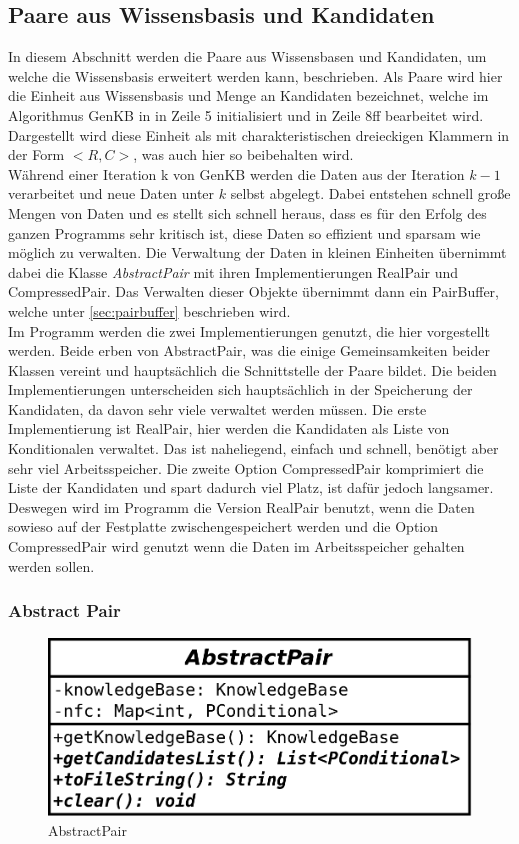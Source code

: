 \documentclass[12pt,a4paper]{article}
\begin{document}
\subsection{Paare aus Wissensbasis und Kandidaten}
In diesem Abschnitt werden die Paare aus Wissensbasen und Kandidaten, um welche die Wissensbasis erweitert werden kann, beschrieben. Als Paare wird hier die Einheit aus Wissensbasis und Menge an Kandidaten bezeichnet, welche im Algorithmus GenKB in \cite{beierle19} in Zeile 5 initialisiert und in Zeile 8ff bearbeitet wird. Dargestellt wird diese Einheit als mit charakteristischen dreieckigen Klammern in der Form $<R, C>$, was auch hier so beibehalten wird. \\
Während einer Iteration k von GenKB werden die Daten aus der Iteration $ k - 1$ verarbeitet und neue Daten unter $k$ selbst abgelegt. Dabei entstehen schnell große Mengen von Daten und es stellt sich schnell heraus, dass es für den Erfolg des ganzen Programms sehr kritisch ist, diese Daten so effizient und sparsam wie möglich zu verwalten. Die Verwaltung der Daten in kleinen Einheiten übernimmt dabei die Klasse \textit{AbstractPair} mit ihren Implementierungen RealPair und CompressedPair. Das Verwalten dieser Objekte übernimmt dann ein PairBuffer, welche unter \autoref{sec:pairbuffer} beschrieben wird. \\
Im Programm werden die zwei Implementierungen genutzt, die hier vorgestellt werden. Beide erben von AbstractPair, was die einige Gemeinsamkeiten beider Klassen vereint und hauptsächlich die Schnittstelle der Paare bildet. Die beiden Implementierungen unterscheiden sich hauptsächlich in der Speicherung der Kandidaten, da davon sehr viele verwaltet werden müssen. Die erste Implementierung ist RealPair, hier werden die Kandidaten als Liste von Konditionalen verwaltet. Das ist naheliegend, einfach und schnell, benötigt aber sehr viel Arbeitsspeicher. Die zweite Option CompressedPair komprimiert die Liste der Kandidaten und spart dadurch viel Platz, ist dafür jedoch langsamer. Deswegen wird im Programm die Version RealPair benutzt, wenn die Daten sowieso auf der Festplatte zwischengespeichert werden und die Option CompressedPair wird genutzt wenn die Daten im Arbeitsspeicher gehalten werden sollen.


\subsubsection{Abstract Pair}


\begin{figure}
\includegraphics[width=0.45\linewidth]{bilder/AbstractPair.png}
\caption{AbstractPair}
\label{pic:abstractpair}
\end{figure}
\end{document}
